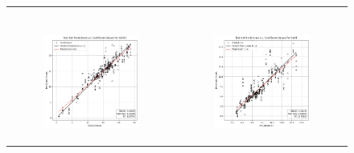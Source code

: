 \begin{figure}
{\begin{tabular}{cc}
\begin{subfigure}{0.5\textwidth}
            \end{subfigure} \\
            \begin{subfigure}{0.5\textwidth}
                \includegraphics[width=\textwidth]{images/one_to_one/enetalpha01/Al2O3.png}
            \end{subfigure} & \hspace{3cm}
            \begin{subfigure}{0.5\textwidth}
                \includegraphics[width=\textwidth]{images/one_to_one/enetalpha01/FeOT.png}

\end{subfigure}
\end{tabular}}
\end{figure}
